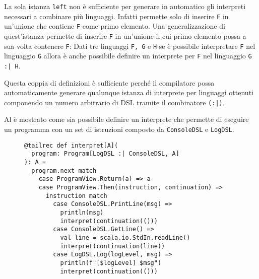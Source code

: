 La sola istanza \lstinline{left} non è sufficiente per generare in automatico gli interpreti necessari a combinare più linguaggi. Infatti permette solo di inserire \lstinline{F} in un'unione che contiene \lstinline{F} come primo elemento. Una generalizzazione di quest'istanza permette di inserire \lstinline{F} in un'unione il cui primo elemento possa a sua volta contenere \lstinline{F}:
Dati tre linguaggi \lstinline{F, G} e \lstinline{H} se è possibile interpretare \lstinline{F} nel linguaggio \lstinline{G} allora è anche possibile definire un interprete per \lstinline{F} nel linguaggio \lstinline{G :| H}.

Questa coppia di definizioni è sufficiente perché il compilatore possa automaticamente generare qualunque istanza di interprete per linguaggi ottenuti componendo un numero arbitrario di DSL tramite il combinatore \lstinline{(:|)}.

Al  è mostrato come sia possibile definire un interprete che permette di eseguire un programma con un set di istruzioni composto da \lstinline{ConsoleDSL} e \lstinline{LogDSL}.

\begin{figure}[htp]
  \begin{lstlisting}[language=scala3, caption={Esempio di interpretazione di un programma composto da più DSL. Il \term{pattern matching} sulle istruzioni permette di gestire istruzioni provenienti da entrambi i DSL di base.}, label={lst:echo}]
@tailrec def interpret[A](
  program: Program[LogDSL :| ConsoleDSL, A]
): A =
  program.next match
    case ProgramView.Return(a) => a
    case ProgramView.Then(instruction, continuation) =>
      instruction match
        case ConsoleDSL.PrintLine(msg) =>
          println(msg)
          interpret(continuation(()))
        case ConsoleDSL.GetLine() =>
          val line = scala.io.StdIn.readLine()
          interpret(continuation(line))
        case LogDSL.Log(logLevel, msg) =>
          println(f"[$logLevel] $msg")
          interpret(continuation(()))
  \end{lstlisting}
\end{figure}
